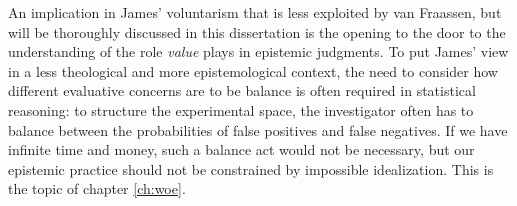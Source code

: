 An implication in  James' voluntarism that is less exploited by van Fraassen, but will be thoroughly discussed in this dissertation is the opening to the door to the understanding of the role \emph{value} plays in epistemic judgments. To put James' view in a less theological and more epistemological context, the need to consider how different evaluative concerns are to be balance is often required in statistical reasoning: to structure the experimental space, the investigator often has to balance between the probabilities of false positives and false negatives. If we have infinite time and money, such a balance act would not be necessary, but our epistemic practice should not be constrained by impossible idealization. This is the topic of chapter \ref{ch:woe}.




